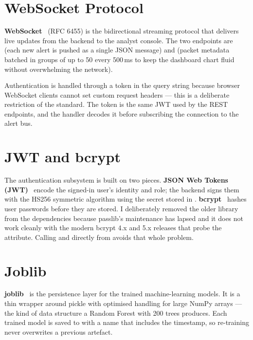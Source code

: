 \section{WebSocket Protocol}
\label{sec:tech-websocket}

\textbf{WebSocket}~\cite{ietf6455} (RFC 6455) is the bidirectional
streaming protocol that delivers live updates from the backend to
the analyst console. The two endpoints are  (each
new alert is pushed as a single JSON message) and 
(packet metadata batched in groups of up to 50 every 500\,ms to
keep the dashboard chart fluid without overwhelming the
network).

Authentication is handled through a token in the query string
because browser WebSocket clients cannot set custom request
headers --- this is a deliberate restriction of the standard. The
token is the same JWT used by the REST endpoints, and the
 handler decodes it before subscribing the
connection to the alert bus.

\section{JWT and bcrypt}
\label{sec:tech-auth}

The authentication subsystem is built on two pieces.
\textbf{JSON Web Tokens (JWT)}~\cite{jwt} encode the signed-in user's
identity and role; the backend signs them with the HS256 symmetric
algorithm using the secret stored in
. \textbf{bcrypt}~\cite{bcrypt} hashes user
passwords before they are stored. I deliberately removed the older
 library from the dependencies because passlib's
maintenance has lapsed and it does not work cleanly with the modern
bcrypt 4.x and 5.x releases that probe the 
attribute. Calling  and 
directly from  avoids that whole
problem.

\section{Joblib}
\label{sec:tech-joblib}

\textbf{joblib}~\cite{joblib} is the persistence layer for the
trained machine-learning models. It is a thin wrapper around pickle
with optimised handling for large NumPy arrays --- the kind of
data structure a Random Forest with 200 trees produces. Each
trained model is saved to  with a name
that includes the timestamp, so re-training never overwrites a
previous artefact.

